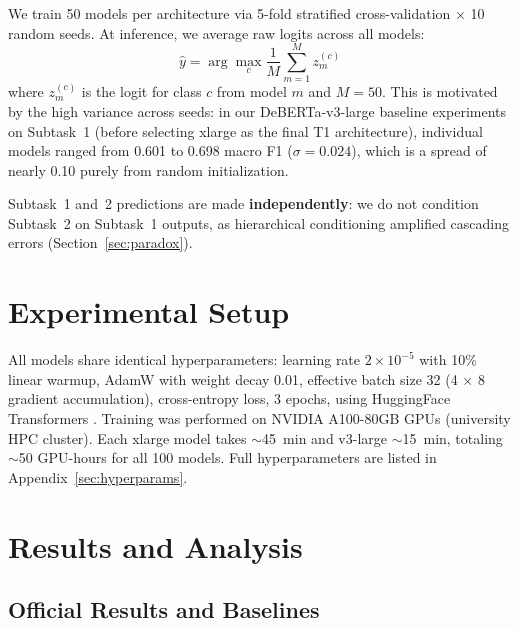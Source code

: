 \documentclass[11pt]{article}
\begin{document}
We train 50 models per architecture via 5-fold stratified cross-validation $\times$ 10 random seeds. At inference, we average raw logits across all models:
\begin{equation}
\hat{y} = \arg\max_c \frac{1}{M} \sum_{m=1}^{M} z_m^{(c)}
\label{eq:ensemble}
\end{equation}
where $z_m^{(c)}$ is the logit for class $c$ from model $m$ and $M{=}50$. This is motivated by the high variance across seeds: in our DeBERTa-v3-large baseline experiments on Subtask~1 (before selecting xlarge as the final T1 architecture), individual models ranged from 0.601 to 0.698 macro F1 ($\sigma{=}0.024$), which is a spread of nearly 0.10 purely from random initialization.

Subtask~1 and~2 predictions are made \textbf{independently}: we do not condition Subtask~2 on Subtask~1 outputs, as hierarchical conditioning amplified cascading errors (Section~\ref{sec:paradox}).

\section{Experimental Setup}

All models share identical hyperparameters: learning rate $2{\times}10^{-5}$ with 10\% linear warmup, AdamW \citep{loshchilov2019adamw} with weight decay 0.01, effective batch size 32 (4 $\times$ 8 gradient accumulation), cross-entropy loss, 3 epochs, using HuggingFace Transformers \citep{wolf2020transformers}. Training was performed on NVIDIA A100-80GB GPUs (university HPC cluster). Each xlarge model takes $\sim$45~min and v3-large $\sim$15~min, totaling $\sim$50 GPU-hours for all 100 models. Full hyperparameters are listed in Appendix~\ref{sec:hyperparams}.

\section{Results and Analysis}

\subsection{Official Results and Baselines}
\end{document}

